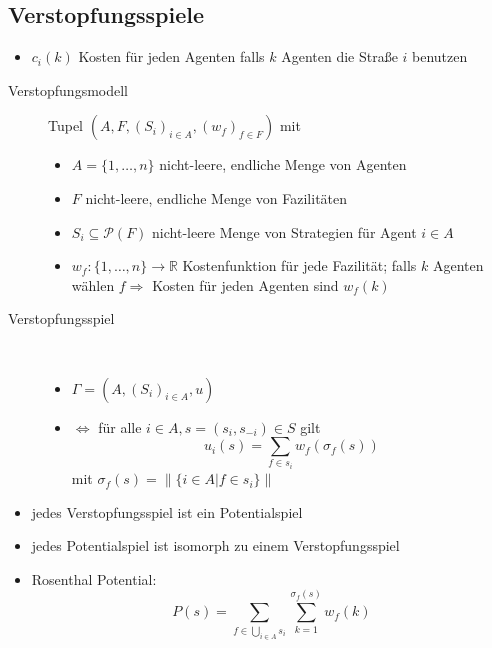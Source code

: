 \subsection{Verstopfungsspiele}
	\begin{itemize}
		\item $c_i(k)$ Kosten für jeden Agenten falls $k$ Agenten die Straße $i$ benutzen
	\end{itemize}
	\begin{description}
		\item[Verstopfungsmodell] Tupel $(A,F,(S_i)_{i\in A},(w_f)_{f\in F})$ mit
			\begin{itemize}
				\item $A=\{1,\dots, n\}$ nicht-leere, endliche Menge von Agenten
				\item $F$ nicht-leere, endliche Menge von Fazilitäten
				\item $S_i\subseteq\mathcal{P}(F)$ nicht-leere Menge von Strategien für Agent $i\in A$
				\item $w_f : \{1,\dots,n\}\rightarrow\mathbb{R}$ Kostenfunktion für jede Fazilität; falls $k$ Agenten wählen $f\Rightarrow$ Kosten für jeden Agenten sind $w_f(k)$
			\end{itemize}
		\item[Verstopfungsspiel] \ \\\vspace*{-\baselineskip}
			\begin{itemize}
				\item $\Gamma=(A,(S_i)_{i\in A},u)$
				\item $\Leftrightarrow$ für alle $i\in A, s=(s_i,s_{-i})\in S$ gilt
					\[u_i(s)=\sum\limits_{f\in s_i}w_f(\sigma_f(s))\]
					mit $\sigma_f(s)=\|\{i\in A|f\in s_i\}\|$
			\end{itemize}
	\end{description}
	\begin{itemize}
		\item jedes Verstopfungsspiel ist ein Potentialspiel
		\item jedes Potentialspiel ist isomorph zu einem Verstopfungsspiel
		\item Rosenthal Potential:
			\[P(s)=\sum\limits_{f\in\bigcup\limits_{i\in A}s_i}\sum\limits_{k=1}^{\sigma_f(s)}w_f(k)\]
	\end{itemize}